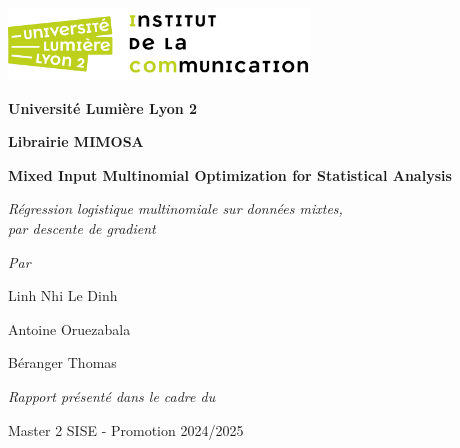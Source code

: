 \documentclass[10pt,french]{report}
\begin{document}
	\begin{titlepage}
		\centering
		\includegraphics[width=0.6\textwidth]{icom.png}\par\vspace{0.5cm}
		{\Large\bfseries Université Lumière Lyon 2}\par
        \par\vspace{3.5cm}



		{\Huge\bfseries Librairie MIMOSA}\par\vspace{0.75cm}
		{\huge\bfseries Mixed Input Multinomial Optimization for Statistical Analysis}\par\vspace{0.75cm}

		{\Large\itshape Régression logistique multinomiale sur données mixtes,\\par descente de gradient}\par\vspace{3.5cm}

		{\Large\itshape Par}\par
		{\Large Linh Nhi Le Dinh}\par
		{\Large Antoine Oruezabala}\par
		{\Large Béranger Thomas}\par\vspace{1cm}

		{\large\itshape Rapport présenté dans le cadre du}\par
		{\large Master 2 SISE - Promotion 2024/2025}\par\vspace{1cm}

		\vfill

	\end{titlepage}

	\tableofcontents

	\setlength{\parskip}{12pt}

	\begin{abstract}
		Ce rapport détaille l'implémentation de la régression logistique multinomiale pour des données mixtes, en langage R, et en utilisant la descente de gradient. Nous couvrons tout d'abord quelques fondements théoriques, puis l'approche pratique et enfin discutons des résultats obtenus. En fin d'ouvrage, une bibliographie donnera quelques pistes au lecteur curieux d'approfondir certains aspects, ou désireux d'apprendre par le biais d'une pédagogie quelque fois différente de celle de ce rapport. Un lexique vient également compléter nos écrits et donne accès à des définitions et formules mathématiques de façon plus condensés que dans le corps du texte.

		Ce rapport a été rédigé en novembre 2024 dans le cadre d'un projet du master 2 SISE.
	\end{abstract}
\end{document}
